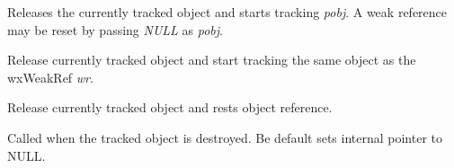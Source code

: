 \label{wxweakrefoperatorassign}


Releases the currently tracked object and starts tracking {\it pobj}.
A weak reference may be reset by passing {\it NULL} as {\it pobj}.


\label{wxweakrefoperatorassign2}


Release currently tracked object and start tracking the same object as
the wxWeakRef {\it wr}.


\label{wxweakrefrelease}


Release currently tracked object and rests object reference.


\label{wxweakrefonobjectdestroy}


Called when the tracked object is destroyed. Be default sets
internal pointer to NULL.

